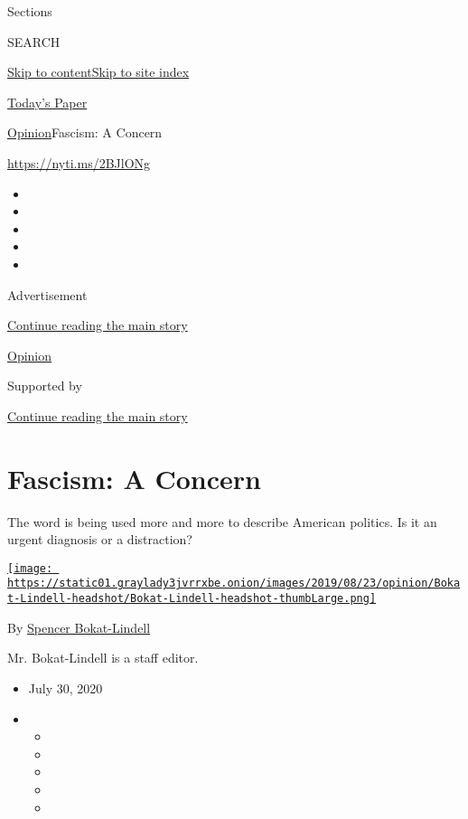 Sections

SEARCH

\protect\hyperlink{site-content}{Skip to
content}\protect\hyperlink{site-index}{Skip to site index}

\href{https://myaccount.nytimes3xbfgragh.onion/auth/login?response_type=cookie\&client_id=vi}{}

\href{https://www.nytimes3xbfgragh.onion/section/todayspaper}{Today's
Paper}

\href{/section/opinion}{Opinion}\textbar{}Fascism: A Concern

\url{https://nyti.ms/2BJlONg}

\begin{itemize}
\item
\item
\item
\item
\item
\end{itemize}

Advertisement

\protect\hyperlink{after-top}{Continue reading the main story}

\href{/section/opinion}{Opinion}

Supported by

\protect\hyperlink{after-sponsor}{Continue reading the main story}

\hypertarget{fascism-a-concern}{%
\section{Fascism: A Concern}\label{fascism-a-concern}}

The word is being used more and more to describe American politics. Is
it an urgent diagnosis or a distraction?

\href{https://www.nytimes3xbfgragh.onion/by/spencer-bokat-lindell}{\texttt{[image: https://static01.graylady3jvrrxbe.onion/images/2019/08/23/opinion/Bokat-Lindell-headshot/Bokat-Lindell-headshot-thumbLarge.png]}}

By
\href{https://www.nytimes3xbfgragh.onion/by/spencer-bokat-lindell}{Spencer
Bokat-Lindell}

Mr. Bokat-Lindell is a staff editor.

\begin{itemize}
\item
  July 30, 2020
\item
  \begin{itemize}
  \item
  \item
  \item
  \item
  \item
  \end{itemize}
\end{itemize}


